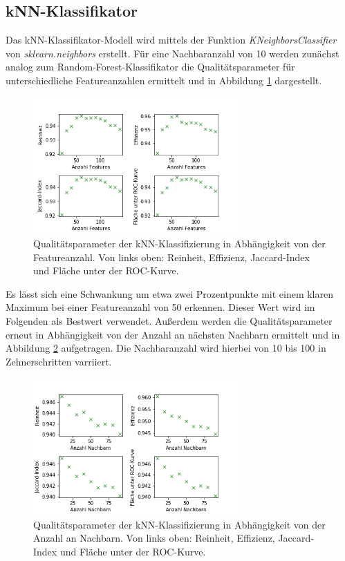   \subsection{kNN-Klassifikator}
  Das kNN-Klassifikator-Modell wird mittels der Funktion \textit{KNeighborsClassifier} von \textit{sklearn.neighbors} erstellt. Für eine Nachbaranzahl von 10 werden zunächst analog zum Random-Forest-Klassifikator die Qualitätsparameter für unterschiedliche Featureanzahlen ermittelt und in Abbildung \ref{fig:kNN_feat} dargestellt.
  \begin{figure}
    \centering
    \includegraphics[width=0.7\textwidth]{plots/kNN_featurezahl.png}
    \caption{Qualitätsparameter der kNN-Klassifizierung in Abhängigkeit von der Featureanzahl. Von links oben: Reinheit, Effizienz, Jaccard-Index und Fläche unter der ROC-Kurve.}
    \label{fig:kNN_feat}
  \end{figure}
  \FloatBarrier
Es lässt sich eine Schwankung um etwa zwei Prozentpunkte mit einem klaren Maximum bei einer Featureanzahl von 50 erkennen. Dieser Wert wird im Folgenden als Bestwert verwendet.
Außerdem werden die Qualitätsparameter erneut in Abhängigkeit von der Anzahl an nächsten Nachbarn ermittelt und in Abbildung \ref{fig:kNN_nachbarn} aufgetragen. Die Nachbaranzahl wird hierbei von 10 bis 100 in Zehnerschritten varriiert.
\begin{figure}
    \centering
    \includegraphics[width=0.7\textwidth]{plots/kNN_nachbarzahl.png}
    \caption{Qualitätsparameter der kNN-Klassifizierung in Abhängigkeit von der Anzahl an Nachbarn. Von links oben: Reinheit, Effizienz, Jaccard-Index und Fläche unter der ROC-Kurve.}
    \label{fig:kNN_nachbarn}
  \end{figure}
